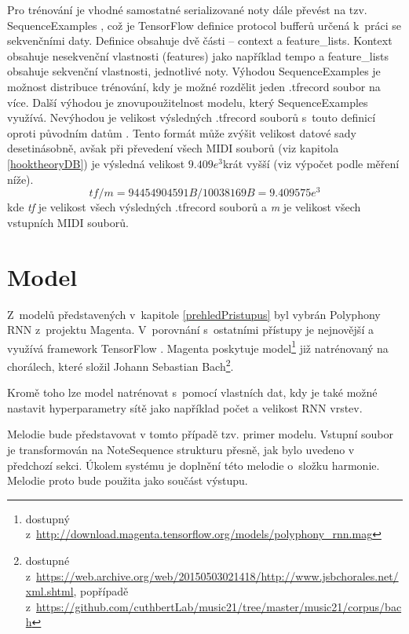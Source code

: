 Pro trénování je vhodné samostatné serializované noty dále převést na tzv. SequenceExamples
\cite{google_git_polyphony},
což je TensorFlow definice protocol bufferů určená k~práci se sekvenčními daty.
Definice obsahuje dvě části -- context a feature\_lists.
Kontext obsahuje nesekvenční vlastnosti (features) jako například tempo a 
feature\_lists obsahuje sekvenční vlastnosti, jednotlivé noty.
Výhodou SequenceExamples je možnost distribuce trénování, 
kdy je možné rozdělit jeden .tfrecord soubor na více.
Další výhodou je znovupoužitelnost modelu, který SequenceExamples využívá.
Nevýhodou je velikost výsledných .tfrecord souborů s~touto definicí oproti původním datům 
\cite{britz_undocumentedFeatures}.
Tento formát může zvýšit velikost datové sady desetinásobně,
avšak při převedení všech MIDI souborů (viz kapitola \ref{hooktheoryDB}) 
je výsledná velikost $9.409e^3$krát vyšší (viz výpočet podle měření níže).
\begin{equation}
     tf / m = 94454904591B / 10038169B = 9.409575e^3
\end{equation}
kde \emph{tf} je velikost všech výsledných .tfrecord souborů 
a \emph{m} je velikost všech vstupních MIDI souborů.

\section{Model}
Z~modelů představených v~kapitole \ref{prehledPristupus} byl vybrán 
Polyphony RNN z~projektu Magenta.
V~porovnání s~ostatními přístupy je nejnovější a využívá framework TensorFlow
\cite{YinCheng_comparativeStudy,google_git_polyphony}.
Magenta poskytuje model\footnote{dostupný z~\url{http://download.magenta.tensorflow.org/models/polyphony_rnn.mag}} 
již natrénovaný na chorálech, které složil Johann Sebastian Bach\footnote{
dostupné z~\url{https://web.archive.org/web/20150503021418/http://www.jsbchorales.net/xml.shtml}, 
popřípadě z~\url{https://github.com/cuthbertLab/music21/tree/master/music21/corpus/bach}}.

Kromě toho lze model natrénovat s~pomocí vlastních dat,
kdy je také možné nastavit hyperparametry sítě jako například počet a velikost RNN vrstev.
\cite{google_git_polyphony}
\par

Melodie bude představovat v tomto případě tzv. primer modelu.
Vstupní soubor je transformován na NoteSequence strukturu
přesně, jak bylo uvedeno v předchozí sekci.
Úkolem systému je doplnění této melodie o~složku harmonie. 
Melodie proto bude použita jako součást výstupu.

